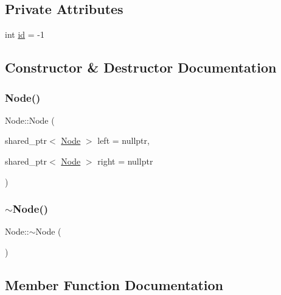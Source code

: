 \subsection*{Private Attributes}
\begin{DoxyCompactItemize}
\item 
int \hyperlink{class_node_a59a543130a10c95f1e8642cf8c5645e8}{id} = -\/1
\end{DoxyCompactItemize}


\subsection{Constructor \& Destructor Documentation}
\mbox{\label{class_node_aade5a3c528aedf9de57dd1efc83d76cb}} 
\subsubsection{\texorpdfstring{Node()}{Node()}}
{\footnotesize\ttfamily Node\+::\+Node (\begin{DoxyParamCaption}\item[{shared\+\_\+ptr$<$ \hyperlink{class_node}{Node} $>$}]{left = {\ttfamily nullptr},  }\item[{shared\+\_\+ptr$<$ \hyperlink{class_node}{Node} $>$}]{right = {\ttfamily nullptr} }\end{DoxyParamCaption})\hspace{0.3cm}{\ttfamily [explicit]}}

\mbox{\label{class_node_aa0840c3cb5c7159be6d992adecd2097c}} 
\subsubsection{\texorpdfstring{$\sim$\+Node()}{~Node()}}
{\footnotesize\ttfamily Node\+::$\sim$\+Node (\begin{DoxyParamCaption}{ }\end{DoxyParamCaption})\hspace{0.3cm}{\ttfamily [virtual]}}



\subsection{Member Function Documentation}
\mbox{\label{class_node_afd9769d942984448aa8e541ada73b289}} 

